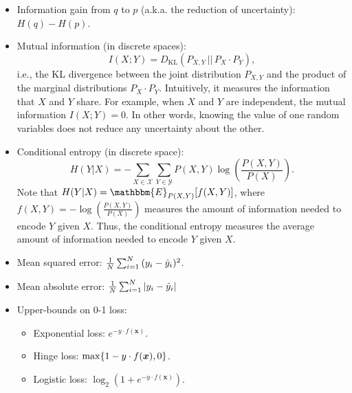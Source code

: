 \begin{itemize}
        \item Information gain from $q$ to $p$ (a.k.a. the reduction of uncertainty): $H(q) - H(p)$.
        \item Mutual information (in discrete spaces): 
            \begin{equation*}
                I(X; Y) = D_\text{KL}\left( P_{X, Y} \, || \, P_X \cdot P_Y \right),
            \end{equation*}
        i.e., the KL divergence between the joint distribution $P_{X, Y}$ and the product of the marginal distributions $P_X \cdot P_Y$.
        Intuitively, it measures the information that $X$ and $Y$ share. 
        For example, when $X$ and $Y$ are independent, the mutual information $I(X; Y)=0$. In other words, knowing the value of one  random variables does not reduce any uncertainty about the other.
        \item Conditional entropy (in discrete space):
            \begin{equation*}
                H(Y|X) = - \sum_{X \in \mathcal{X}}^{}{
                    \sum_{Y \in \mathcal{Y}}^{}{
                        P(X, Y) \log\left(\frac{P(X, Y)}{P(X)}\right)
                    }
                }.
            \end{equation*}
        Note that $H(Y|X) = \mathbbm{E}_{P(X, Y)}[f(X, Y)]$, where $f(X, Y)=-\log\left(\frac{P(X, Y)}{P(X)}\right)$ measures the amount of information needed to encode $Y$ given $X$.
        Thus, the conditional entropy measures the average amount of information needed to encode $Y$ given $X$.
        \item Mean squared error: $\frac{1}{N}\sum_{i=1}^{N}{(y_i - \hat{y}_i)^2}$.
        \item Mean absolute error: $\frac{1}{N}\sum_{i=1}^{N}{| y_i - \hat{y}_i |}$
        \item Upper-bounds on 0-1 loss:
            \begin{itemize}
                \item Exponential loss: $e^{-y \cdot f(\bm{x})}$.
                \item Hinge loss: $\max\{ 1 - y \cdot f(\bm{x}), 0 \}$.
                \item Logistic loss: $\log_2\left( 1 + e^{-y \cdot f(\bm{x})}\right)$. 
            \end{itemize}
    \end{itemize}
    

